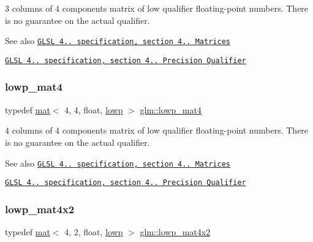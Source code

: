3 columns of 4 components matrix of low qualifier floating-\/point numbers. There is no guarantee on the actual qualifier.

\begin{DoxySeeAlso}{See also}
\href{http://www.opengl.org/registry/doc/GLSLangSpec.4.20.8.pdf}{\tt G\+L\+SL 4.. specification, section 4.. Matrices} 

\href{http://www.opengl.org/registry/doc/GLSLangSpec.4.20.8.pdf}{\tt G\+L\+SL 4.. specification, section 4.. Precision Qualifier} 
\end{DoxySeeAlso}
\mbox{\label{group__core__precision_ga692c14e84ad690b182373bec9fdf1ab9}} 
\subsubsection{\texorpdfstring{lowp\+\_\+mat4}{lowp\_mat4}}
{\footnotesize\ttfamily typedef \hyperlink{structglm_1_1mat}{mat}$<$ 4, 4, float, \hyperlink{namespaceglm_a36ed105b07c7746804d7fdc7cc90ff25ae161af3fc695e696ce3bf69f7332bc2d}{lowp} $>$ \hyperlink{group__core__precision_ga692c14e84ad690b182373bec9fdf1ab9}{glm\+::lowp\+\_\+mat4}}

4 columns of 4 components matrix of low qualifier floating-\/point numbers. There is no guarantee on the actual qualifier.

\begin{DoxySeeAlso}{See also}
\href{http://www.opengl.org/registry/doc/GLSLangSpec.4.20.8.pdf}{\tt G\+L\+SL 4.. specification, section 4.. Matrices} 

\href{http://www.opengl.org/registry/doc/GLSLangSpec.4.20.8.pdf}{\tt G\+L\+SL 4.. specification, section 4.. Precision Qualifier} 
\end{DoxySeeAlso}
\mbox{\label{group__core__precision_gacd6c35b61e9de6ad39767ea58660a602}} 
\subsubsection{\texorpdfstring{lowp\+\_\+mat4x2}{lowp\_mat4x2}}
{\footnotesize\ttfamily typedef \hyperlink{structglm_1_1mat}{mat}$<$ 4, 2, float, \hyperlink{namespaceglm_a36ed105b07c7746804d7fdc7cc90ff25ae161af3fc695e696ce3bf69f7332bc2d}{lowp} $>$ \hyperlink{group__core__precision_gacd6c35b61e9de6ad39767ea58660a602}{glm\+::lowp\+\_\+mat4x2}}


